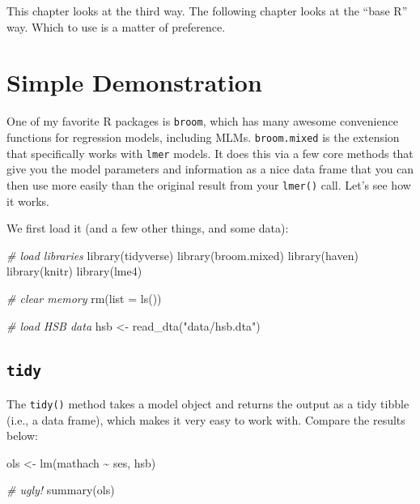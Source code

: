 \documentclass[
  letterpaper,
  DIV=11,
  numbers=noendperiod]{scrreprt}
\newenvironment{Shaded}{\begin{snugshade}}{\end{snugshade}}
\newcommand{\AttributeTok}[1]{\textcolor[rgb]{0.49,0.56,0.16}{#1}}
\newcommand{\CommentTok}[1]{\textcolor[rgb]{0.38,0.63,0.69}{\textit{#1}}}
\newcommand{\FunctionTok}[1]{\textcolor[rgb]{0.02,0.16,0.49}{#1}}
\newcommand{\NormalTok}[1]{\textcolor[rgb]{0.00,0.44,0.13}{#1}}
\newcommand{\OtherTok}[1]{\textcolor[rgb]{0.00,0.44,0.13}{#1}}
\newcommand{\SpecialCharTok}[1]{\textcolor[rgb]{0.25,0.44,0.63}{#1}}
\newcommand{\StringTok}[1]{\textcolor[rgb]{0.25,0.44,0.63}{#1}}
\begin{document}
This chapter looks at the third way. The following chapter looks at the
``base R'' way. Which to use is a matter of preference.

\hypertarget{simple-demonstration}{%
\section{Simple Demonstration}\label{simple-demonstration}}

One of my favorite R packages is \texttt{broom}, which has many awesome
convenience functions for regression models, including MLMs.
\texttt{broom.mixed} is the extension that specifically works with
\texttt{lmer} models. It does this via a few core methods that give you
the model parameters and information as a nice data frame that you can
then use more easily than the original result from your \texttt{lmer()}
call. Let's see how it works.

We first load it (and a few other things, and some data):

\begin{Shaded}
\begin{Highlighting}[]
\CommentTok{\# load libraries}
\FunctionTok{library}\NormalTok{(tidyverse)}
\FunctionTok{library}\NormalTok{(broom.mixed)}
\FunctionTok{library}\NormalTok{(haven)}
\FunctionTok{library}\NormalTok{(knitr)}
\FunctionTok{library}\NormalTok{(lme4)}

\CommentTok{\# clear memory}
\FunctionTok{rm}\NormalTok{(}\AttributeTok{list =} \FunctionTok{ls}\NormalTok{())}

\CommentTok{\# load HSB data}
\NormalTok{hsb }\OtherTok{\textless{}{-}} \FunctionTok{read\_dta}\NormalTok{(}\StringTok{"data/hsb.dta"}\NormalTok{)}
\end{Highlighting}
\end{Shaded}

\hypertarget{tidy}{%
\subsection{\texorpdfstring{\texttt{tidy}}{tidy}}\label{tidy}}

The \texttt{tidy()} method takes a model object and returns the output
as a tidy tibble (i.e., a data frame), which makes it very easy to work
with. Compare the results below:

\begin{Shaded}
\begin{Highlighting}[]
\NormalTok{ols }\OtherTok{\textless{}{-}} \FunctionTok{lm}\NormalTok{(mathach }\SpecialCharTok{\textasciitilde{}}\NormalTok{ ses, hsb)}

\CommentTok{\# ugly!}
\FunctionTok{summary}\NormalTok{(ols)}
\end{Highlighting}
\end{Shaded}
\end{document}
